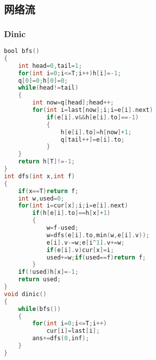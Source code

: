 \subsection{网络流}
\subsubsection{Dinic}
\begin{lstlisting}[language=C] 
bool bfs()
{
	int head=0,tail=1;
	for(int i=0;i<=T;i++)h[i]=-1;
	q[0]=0;h[0]=0;
	while(head!=tail)
	{
		int now=q[head];head++;
		for(int i=last[now];i;i=e[i].next)
			if(e[i].v&&h[e[i].to]==-1)
			{
				h[e[i].to]=h[now]+1;
				q[tail++]=e[i].to;
			}
	}
	return h[T]!=-1;
}
int dfs(int x,int f)
{
	if(x==T)return f;
	int w,used=0;
	for(int i=cur[x];i;i=e[i].next)
		if(h[e[i].to]==h[x]+1)
		{
			w=f-used;
			w=dfs(e[i].to,min(w,e[i].v));
			e[i].v-=w;e[i^1].v+=w;
			if(e[i].v)cur[x]=i;
			used+=w;if(used==f)return f;
		}
	if(!used)h[x]=-1;
	return used;
}
void dinic()
{
	while(bfs())
	{
		for(int i=0;i<=T;i++)
			cur[i]=last[i];
		ans+=dfs(0,inf);
	}
}
\end{lstlisting}
